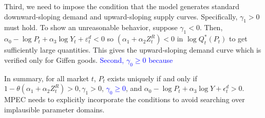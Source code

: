\documentclass[11pt, a4paper]{article}
\begin{document}
Third, we need to impose the condition that the model generates standard downward-sloping demand and upward-sloping supply curves. Specifically, $\gamma_1>0$ must hold. 
To show an unreasonable behavior, suppose $\gamma_1<0$. 
Then, $\alpha_0 - \log P_{t} + \alpha_3 \log Y_t + \varepsilon^{d}_{t}<0$ so $(\alpha_1 + \alpha_2 Z^{R}_{t})<0$ in $\log Q_t^{*}(P_{t})$ to get sufficiently large quantities. This gives the upward-sloping demand curve which is verified only for Giffen goods. %
\textcolor{blue}{Second, $\gamma_0\ge 0$ because }


In summary, for all market $t$, $P_{t}$ exists uniquely if and only if $1- \theta(\alpha_1 + \alpha_2 Z_{t}^{R}) >0, \gamma_1>0$, \textcolor{blue}{$\gamma_0\ge 0$}, and $\alpha_0 - \log P_{t} + \alpha_3 \log Y + \epsilon_{t}^{d} > 0$. MPEC needs to explicitly incorporate the conditions to avoid searching over implausible parameter domains.
\end{document}
